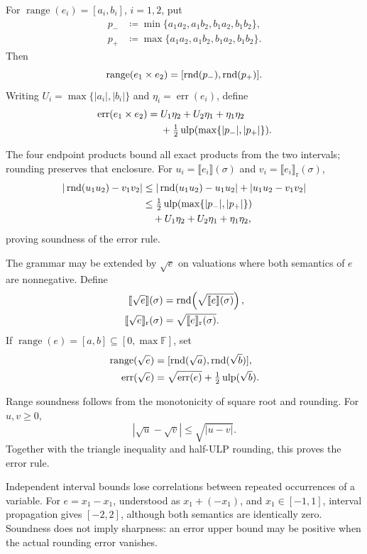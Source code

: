 \begin{definition}
For $\operatorname{range}(e_i)=[a_i, b_i]$, $i=1, 2$, put
\[
 \begin{aligned}
 p_-&\coloneqq\min\{a_1a_2, a_1b_2, b_1a_2, b_1b_2\}, \\
 p_+&\coloneqq\max\{a_1a_2, a_1b_2, b_1a_2, b_1b_2\}.
 \end{aligned}
\]
Then
\[
 \operatorname{range}(e_1\times e_2)
 =[\operatorname{rnd}(p_-), \operatorname{rnd}(p_+)].
\]
Writing $U_i=\max\{|a_i|, |b_i|\}$ and
$\eta_i=\operatorname{err}(e_i)$, define
\[
 \begin{aligned}
 \operatorname{err}(e_1\times e_2)
 ={}&U_1\eta_2+U_2\eta_1+\eta_1\eta_2\\
 &+\tfrac12\operatorname{ulp}(\max\{|p_-|, |p_+|\}).
 \end{aligned}
\]
\end{definition}
The four endpoint products bound all exact products from
the two intervals; rounding preserves that enclosure.
For $u_i=\llbracket e_i\rrbracket(\sigma)$ and
$v_i=\llbracket e_i\rrbracket_{\mathrm r}(\sigma)$,
\[
 \begin{aligned}
 |\operatorname{rnd}(u_1u_2)-v_1v_2|
 &\le|\operatorname{rnd}(u_1u_2)-u_1u_2|+|u_1u_2-v_1v_2|\\
 &\le\tfrac12\operatorname{ulp}(\max\{|p_-|, |p_+|\})\\
 &\quad+U_1\eta_2+U_2\eta_1+\eta_1\eta_2,
 \end{aligned}
\]
proving soundness of the error rule.

\begin{definition}
The grammar may be extended by $\sqrt e$ on valuations where
both semantics of $e$ are nonnegative. Define
\[
 \begin{aligned}
 \llbracket\sqrt e\rrbracket(\sigma)
 &=\operatorname{rnd}\!\left(\sqrt{\llbracket e\rrbracket(\sigma)}\right), \\
 \llbracket\sqrt e\rrbracket_{\mathrm r}(\sigma)
 &=\sqrt{\llbracket e\rrbracket_{\mathrm r}(\sigma)}.
 \end{aligned}
\]
If $\operatorname{range}(e)=[a, b]\subseteq[0, \max\mathbb F]$,
set
\[
 \begin{aligned}
 \operatorname{range}(\sqrt e)
 &=[\operatorname{rnd}(\sqrt a), \operatorname{rnd}(\sqrt b)], \\
 \operatorname{err}(\sqrt e)
 &=\sqrt{\operatorname{err}(e)}+\tfrac12\operatorname{ulp}(\sqrt b).
 \end{aligned}
\]
\end{definition}
Range soundness follows from the monotonicity of square root and
rounding. For $u, v\ge0$,
\[
 |\sqrt u-\sqrt v|\le\sqrt{|u-v|}.
\]
Together with the triangle inequality and half-ULP rounding,
this proves the error rule.

\begin{remark}
Independent interval bounds lose correlations between repeated
occurrences of a variable. For $e=x_1-x_1$, understood as
$x_1+(-x_1)$, and $x_1\in[-1, 1]$, interval propagation gives
$[-2, 2]$, although both semantics are identically zero.
Soundness does not imply sharpness: an error upper bound
may be positive when the actual rounding error vanishes.
\end{remark}

\endgroup
